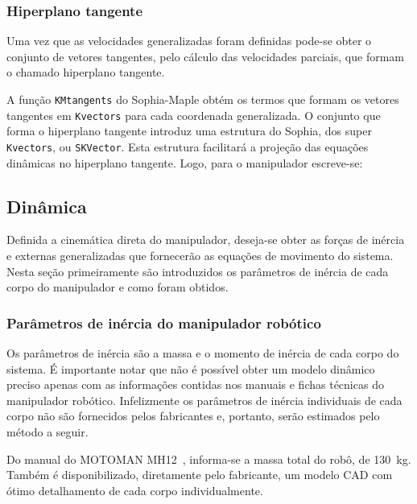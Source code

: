 \subsubsection{Hiperplano tangente}

Uma vez que as velocidades generalizadas foram definidas pode-se obter o
conjunto de vetores tangentes, pelo cálculo das velocidades parciais, que formam
o chamado hiperplano tangente.

A função \texttt{KMtangents} do Sophia-Maple obtém os termos que formam os
vetores tangentes em \texttt{Kvectors} para cada coordenada generalizada. O
conjunto que forma o hiperplano tangente introduz uma estrutura do Sophia, dos
super \texttt{Kvectors}, ou \texttt{SKVector}. Esta estrutura facilitará a
projeção das equações dinâmicas no hiperplano tangente. Logo, para o manipulador
escreve-se:

\bigskip {} \bigskip 


\subsection{Dinâmica}

Definida a cinemática direta do manipulador, deseja-se obter as forças de
inércia e externas generalizadas que fornecerão as equações de movimento do
sistema. Nesta seção primeiramente são introduzidos os parâmetros de inércia de
cada corpo do manipulador e como foram obtidos.

\subsubsection{Parâmetros de inércia do manipulador robótico}

Os parâmetros de inércia são a massa e o momento de inércia de cada corpo do
sistema. É importante notar que não é possível obter um modelo dinâmico preciso
apenas com as informações contidas nos manuais e fichas técnicas do manipulador
robótico. Infelizmente os parâmetros de inércia individuais de cada corpo não
são fornecidos pelos fabricantes e, portanto, serão estimados pelo método a
seguir.

Do manual do MOTOMAN MH12~\cite{manualmh12}, informa-se a massa total do robô,
de 130~kg. Também é disponibilizado, diretamente pelo fabricante, um modelo CAD
com ótimo detalhamento de cada corpo individualmente.

